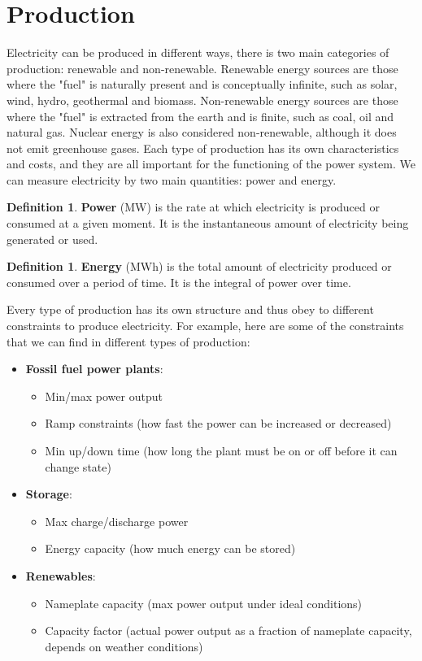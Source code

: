 \documentclass[12pt, openany]{report}
\theoremstyle{definition}
\newtheorem{definition}[thm]{Definition}
\begin{document}
\section{Production}
Electricity can be produced in different ways, there is two main categories of production: renewable and non-renewable. Renewable energy sources are those where the "fuel" is naturally present and is conceptually infinite, such as solar, wind, hydro, geothermal and biomass. Non-renewable energy sources are those where the "fuel" is extracted from the earth and is finite, such as coal, oil and natural gas. Nuclear energy is also considered non-renewable, although it does not emit greenhouse gases. Each type of production has its own characteristics and costs, and they are all important for the functioning of the power system.
We can measure electricity by two main quantities: power and energy.
\begin{definition}
    \textbf{Power} (MW) is the rate at which electricity is produced or consumed at a given moment. It is the instantaneous amount of electricity being generated or used.
\end{definition} 
\begin{definition}
    \textbf{Energy} (MWh) is the total amount of electricity produced or consumed over a period of time. It is the integral of power over time. 
\end{definition}
Every type of production has its own structure and thus obey to different constraints to produce electricity. For example, here are some of the constraints that we can find in different types of production:
\begin{itemize}
    \item \textbf{Fossil fuel power plants}:
    \begin{itemize}
        \item Min/max power output
        \item Ramp constraints (how fast the power can be increased or decreased)
        \item Min up/down time (how long the plant must be on or off before it can change state)
    \end{itemize}
    \item \textbf{Storage}:
    \begin{itemize}
        \item Max charge/discharge power
        \item Energy capacity (how much energy can be stored)
    \end{itemize}
    \item \textbf{Renewables}:
    \begin{itemize}
        \item Nameplate capacity (max power output under ideal conditions)
        \item Capacity factor (actual power output as a fraction of nameplate capacity, depends on weather conditions)
    \end{itemize}
\end{itemize}
\end{document}

